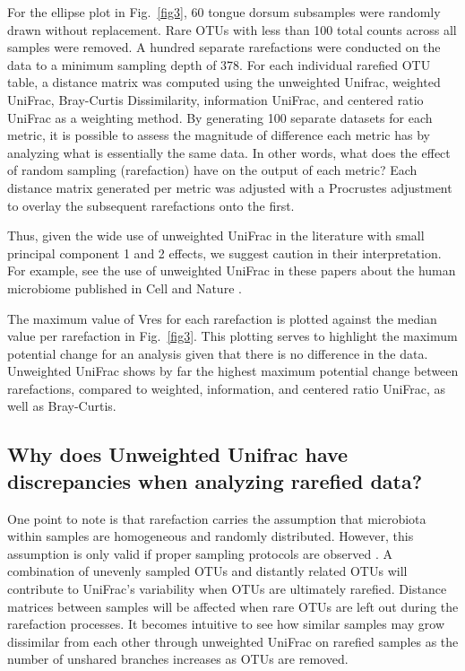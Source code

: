 \documentclass[10pt,letterpaper]{article}
\begin{document}
For the ellipse plot in Fig.~\ref{fig3}, 60 tongue dorsum subsamples were randomly drawn without replacement. Rare OTUs with less than 100 total counts across all samples were removed. A hundred separate rarefactions were conducted on the data to a minimum sampling depth of 378. For each individual rarefied OTU table, a distance matrix was computed using the unweighted Unifrac, weighted UniFrac, Bray-Curtis Dissimilarity, information UniFrac, and centered ratio UniFrac as a weighting method. By generating 100 separate datasets for each metric, it is possible to assess the magnitude of difference each metric has by analyzing what is essentially the same data. In other words, what does the effect of random sampling (rarefaction) have on the output of each metric? Each distance matrix generated per metric was adjusted with a Procrustes adjustment to overlay the subsequent rarefactions onto the first.

Thus, given the wide use of unweighted UniFrac in the literature with small principal component 1 and 2 effects, we suggest caution in their interpretation. For example, see the use of unweighted UniFrac in these papers about the human microbiome published in Cell\cite{hsiao2013microbiota} and Nature \cite{sonnenburg2016diet}.

The maximum value of Vres for each rarefaction is plotted against the median value per rarefaction in Fig.~\ref{fig3}. This plotting serves to highlight the maximum potential change for an analysis given that there is no difference in the data. Unweighted UniFrac shows by far the highest maximum potential change between rarefactions, compared to weighted, information, and centered ratio UniFrac, as well as Bray-Curtis.

\subsection{Why does Unweighted Unifrac have discrepancies when analyzing rarefied data?}
One point to note is that rarefaction carries the assumption that microbiota within samples are homogeneous and randomly distributed. However, this assumption is only valid if proper sampling protocols are observed \cite{gorzelak2015methods}. A combination of unevenly sampled OTUs and distantly related OTUs will contribute to UniFrac's variability when OTUs are ultimately rarefied. Distance matrices between samples will be affected when rare OTUs are left out during the rarefaction processes. It becomes intuitive to see how similar samples may grow dissimilar from each other through unweighted UniFrac on rarefied samples as the number of unshared branches increases as OTUs are removed.
\end{document}
